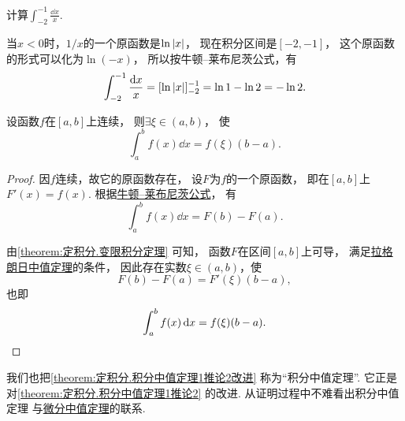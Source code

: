 \begin{example}
计算\(\int_{-2}^{-1} \frac{\dd{x}}{x}\).
\begin{solution}
当\(x<0\)时，\(1/x\)的一个原函数是\(\ln\abs{x}\)，
现在积分区间是\([-2,-1]\)，
这个原函数的形式可以化为\(\ln(-x)\)，
所以按牛顿--莱布尼茨公式，有\begin{equation*}
	\int_{-2}^{-1} \frac{\dd{x}}{x}
	= [ \ln\abs{x} ]_{-2}^{-1}
	= \ln1 - \ln2
	= -\ln2.
\end{equation*}
\end{solution}
\end{example}

\begin{proposition}\label{theorem:定积分.积分中值定理1推论2改进}
设函数\(f\)在\([a,b]\)上连续，
则\(\exists\xi\in(a,b)\)，
使\begin{equation*}
	\int_a^b f(x) \dd{x} = f(\xi) (b-a).
\end{equation*}
\begin{proof}
因\(f\)连续，故它的原函数存在，
设\(F\)为\(f\)的一个原函数，
即在\([a,b]\)上\(F'(x) = f(x)\).
根据\hyperref[equation:定积分.牛顿--莱布尼茨公式]{牛顿--莱布尼茨公式}，
有\begin{equation*}
	\int_a^b f(x) \dd{x}
	= F(b) - F(a).
\end{equation*}

由\cref{theorem:定积分.变限积分定理} 可知，
函数\(F\)在区间\([a,b]\)上可导，
满足\hyperref[theorem:微分中值定理.拉格朗日中值定理]{拉格朗日中值定理}的条件，
因此存在实数\(\xi\in(a,b)\)，使\begin{equation*}
	F(b) - F(a) = F'(\xi) (b-a),
\end{equation*}
也即\begin{equation*}
	\int_a^b f(x) \dd{x} = f(\xi) (b-a).
	\qedhere
\end{equation*}
\end{proof}
\end{proposition}
\begin{remark}
我们也把\cref{theorem:定积分.积分中值定理1推论2改进} 称为“积分中值定理”.
它正是对\cref{theorem:定积分.积分中值定理1推论2} 的改进.
从证明过程中不难看出积分中值定理
与\hyperref[theorem:微分中值定理.拉格朗日中值定理]{微分中值定理}的联系.
\end{remark}

